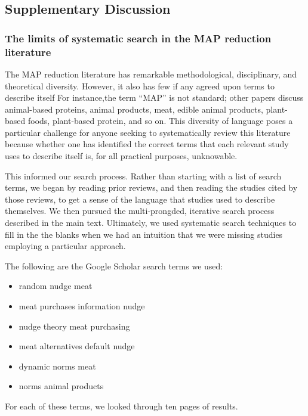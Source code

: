 \documentclass[sn-nature,referee,pdflatex]{sn-jnl}
\providecommand{\tightlist}{%
  \setlength{\itemsep}{0pt}\setlength{\parskip}{0pt}}
\begin{document}
\subsection{Supplementary Discussion}\label{supplementary-discussion}

\subsubsection{The limits of systematic search in the MAP reduction
literature}\label{the-limits-of-systematic-search-in-the-map-reduction-literature}

The MAP reduction literature has remarkable methodological,
disciplinary, and theoretical diversity. However, it also has few if any
agreed upon terms to describe itself For instance,the term ``MAP'' is
not standard; other papers discuss animal-based proteins, animal
products, meat, edible animal products, plant-based foods, plant-based
protein, and so on. This diversity of language poses a particular
challenge for anyone seeking to systematically review this literature
because whether one has identified the correct terms that each relevant
study uses to describe itself is, for all practical purposes,
unknowable.

This informed our search process. Rather than starting with a list of
search terms, we began by reading prior reviews, and then reading the
studies cited by those reviews, to get a sense of the language that
studies used to describe themselves. We then pursued the multi-prongded,
iterative search process described in the main text. Ultimately, we used
systematic search techniques to fill in the the blanks when we had an
intuition that we were missing studies employing a particular approach.

The following are the Google Scholar search terms we used:

\begin{itemize}
\tightlist
\item
  random nudge meat
\item
  meat purchases information nudge
\item
  nudge theory meat purchasing
\item
  meat alternatives default nudge
\item
  dynamic norms meat
\item
  norms animal products
\end{itemize}

For each of these terms, we looked through ten pages of results.
\end{document}
